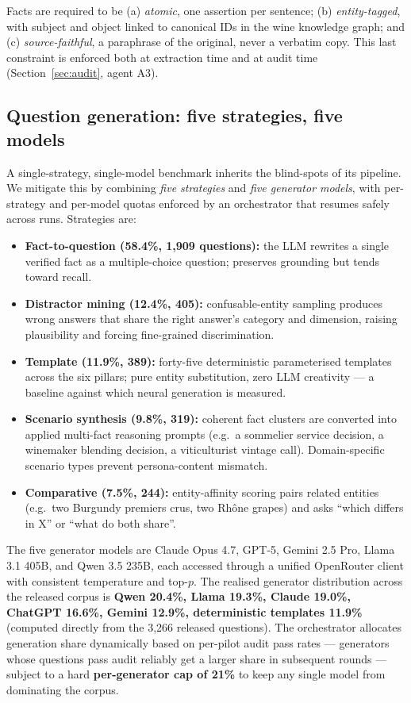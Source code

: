 Facts are required to be (a) \emph{atomic}, one assertion per sentence;
(b) \emph{entity-tagged}, with subject and object linked to canonical
IDs in the wine knowledge graph; and (c) \emph{source-faithful}, a
paraphrase of the original, never a verbatim copy. This last constraint
is enforced both at extraction time and at audit time
(Section~\ref{sec:audit}, agent A3).

\subsection{Question generation: five strategies, five models}
\label{sec:generation}
A single-strategy, single-model benchmark inherits the blind-spots of
its pipeline. We mitigate this by combining \emph{five strategies} and
\emph{five generator models}, with per-strategy and per-model quotas
enforced by an orchestrator that resumes safely across runs. Strategies
are:
\begin{itemize}\itemsep -1pt
  \item \textbf{Fact-to-question (58.4\%, 1{,}909 questions):} the LLM
    rewrites a single verified fact as a multiple-choice question;
    preserves grounding but tends toward recall.
  \item \textbf{Distractor mining (12.4\%, 405):} confusable-entity
    sampling produces wrong answers that share the right answer's
    category and dimension, raising plausibility and forcing
    fine-grained discrimination.
  \item \textbf{Template (11.9\%, 389):} forty-five deterministic
    parameterised templates across the six pillars; pure entity
    substitution, zero LLM creativity --- a baseline against which
    neural generation is measured.
  \item \textbf{Scenario synthesis (9.8\%, 319):} coherent fact clusters
    are converted into applied multi-fact reasoning prompts (e.g.\ a
    sommelier service decision, a winemaker blending decision, a
    viticulturist vintage call). Domain-specific scenario types prevent
    persona-content mismatch.
  \item \textbf{Comparative (7.5\%, 244):} entity-affinity scoring pairs
    related entities (e.g.\ two Burgundy premiers crus, two Rh\^one
    grapes) and asks ``which differs in X'' or ``what do both share''.
\end{itemize}

The five generator models are Claude Opus 4.7, GPT-5, Gemini 2.5 Pro,
Llama 3.1 405B, and Qwen 3.5 235B, each accessed through a unified
OpenRouter client with consistent temperature and top-$p$. The
realised generator distribution across the released corpus is
\textbf{Qwen 20.4\%, Llama 19.3\%, Claude 19.0\%, ChatGPT 16.6\%,
Gemini 12.9\%, deterministic templates 11.9\%} (computed directly
from the 3{,}266 released questions). The orchestrator allocates
generation share dynamically based on per-pilot audit pass rates ---
generators whose questions pass audit reliably get a larger share in
subsequent rounds --- subject to a hard \textbf{per-generator cap of
21\%} to keep any single model from dominating the corpus.

